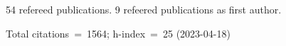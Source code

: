 54 refereed publications. 9 refeered publications as first author.

Total citations~=~1564; h-index~=~25 (2023-04-18)